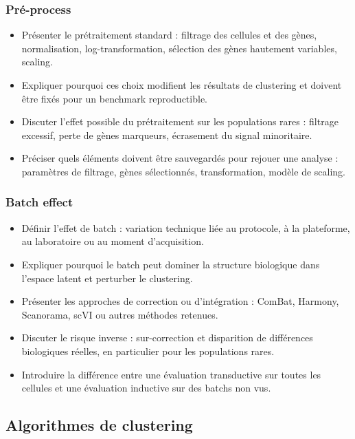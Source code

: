 \subsubsection{Pré-process}
\begin{itemize}
  \item Présenter le prétraitement standard : filtrage des cellules et des gènes, normalisation, log-transformation, sélection des gènes hautement variables, scaling.
  \item Expliquer pourquoi ces choix modifient les résultats de clustering et doivent être fixés pour un benchmark reproductible.
  \item Discuter l'effet possible du prétraitement sur les populations rares : filtrage excessif, perte de gènes marqueurs, écrasement du signal minoritaire.
  \item Préciser quels éléments doivent être sauvegardés pour rejouer une analyse : paramètres de filtrage, gènes sélectionnés, transformation, modèle de scaling.
\end{itemize}

\subsubsection{Batch effect}
\begin{itemize}
  \item Définir l'effet de batch : variation technique liée au protocole, à la plateforme, au laboratoire ou au moment d'acquisition.
  \item Expliquer pourquoi le batch peut dominer la structure biologique dans l'espace latent et perturber le clustering.
  \item Présenter les approches de correction ou d'intégration : ComBat, Harmony, Scanorama, scVI ou autres méthodes retenues.
  \item Discuter le risque inverse : sur-correction et disparition de différences biologiques réelles, en particulier pour les populations rares.
  \item Introduire la différence entre une évaluation transductive sur toutes les cellules et une évaluation inductive sur des batchs non vus.
\end{itemize}

\subsection{Algorithmes de clustering}

